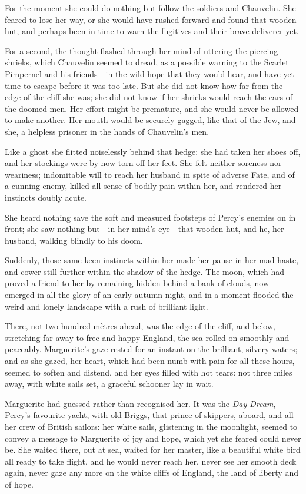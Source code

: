 \documentclass[paper=a5,BCOR=7mm,twoside,DIV=calc,12pt,usegeometry,chapterprefix,endperiod,headings=big]{scrbook}
\begin{document}
For the moment she could do nothing but follow the soldiers and Chauvelin. She feared to lose her way, or she would have rushed forward and found that wooden hut, and perhaps been in time to warn the fugitives and their brave deliverer yet.

For a second, the thought flashed through her mind of uttering the piercing shrieks, which Chauvelin seemed to dread, as a possible warning to the Scarlet Pimpernel and his friends---in the wild hope that they would hear, and have yet time to escape before it was too late. But she did not know how far from the edge of the cliff she was; she did not know if her shrieks would reach the ears of the doomed men. Her effort might be premature, and she would never be allowed to make another. Her mouth would be securely gagged, like that of the Jew, and she, a helpless prisoner in the hands of Chauvelin's men.

Like a ghost she flitted noiselessly behind that hedge: she had taken her shoes off, and her stockings were by now torn off her feet. She felt neither soreness nor weariness; indomitable will to reach her husband in spite of adverse Fate, and of a cunning enemy, killed all sense of bodily pain within her, and rendered her instincts doubly acute.

She heard nothing save the soft and measured footsteps of Percy's enemies on in front; she saw nothing but---in her mind's eye---that wooden hut, and he, her husband, walking blindly to his doom.

Suddenly, those same keen instincts within her made her pause in her mad haste, and cower still further within the shadow of the hedge. The moon, which had proved a friend to her by remaining hidden behind a bank of clouds, now emerged in all the glory of an early autumn night, and in a moment flooded the weird and lonely landscape with a rush of brilliant light.

There, not two hundred mètres ahead, was the edge of the cliff, and below, stretching far away to free and happy England, the sea rolled on smoothly and peaceably. Marguerite's gaze rested for an instant on the brilliant, silvery waters; and as she gazed, her heart, which had been numb with pain for all these hours, seemed to soften and distend, and her eyes filled with hot tears: not three miles away, with white sails set, a graceful schooner lay in wait.

Marguerite had guessed rather than recognised her. It was the \textit{Day Dream}, Percy's favourite yacht, with old Briggs, that prince of skippers, aboard, and all her crew of British sailors: her white sails, glistening in the moonlight, seemed to convey a message to Marguerite of joy and hope, which yet she feared could never be. She waited there, out at sea, waited for her master, like a beautiful white bird all ready to take flight, and he would never reach her, never see her smooth deck again, never gaze any more on the white cliffs of England, the land of liberty and of hope.
\end{document}
